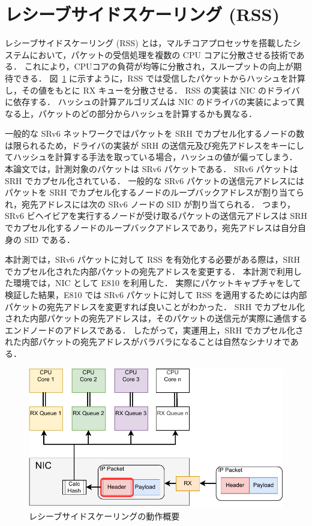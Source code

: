 \section{レシーブサイドスケーリング (RSS)}
\label{sec:rss}
レシーブサイドスケーリング (RSS) とは，マルチコアプロセッサを搭載したシステムにおいて，パケットの受信処理を複数の CPU コアに分散させる技術である．
これにより，CPUコアの負荷が均等に分散され，スループットの向上が期待できる．
図~\ref*{fig:rss} に示すように，RSS では受信したパケットからハッシュを計算し，その値をもとに RX キューを分散させる．
RSS の実装は NIC のドライバに依存する．
ハッシュの計算アルゴリズムは NIC のドライバの実装によって異なる上，パケットのどの部分からハッシュを計算するかも異なる．

一般的な SRv6 ネットワークではパケットを SRH でカプセル化するノードの数は限られるため，ドライバの実装が SRH の送信元及び宛先アドレスをキーにしてハッシュを計算する手法を取っている場合，ハッシュの値が偏ってしまう．
本論文では，計測対象のパケットは SRv6 パケットである．
SRv6 パケットは SRH でカプセル化されている．
一般的な SRv6 パケットの送信元アドレスにはパケットを SRH でカプセル化するノードのループバックアドレスが割り当てられ，宛先アドレスには次の SRv6 ノードの SID が割り当てられる．
つまり，SRv6 ビヘイビアを実行するノードが受け取るパケットの送信元アドレスは SRH でカプセル化するノードのループバックアドレスであり，宛先アドレスは自分自身の SID である．

本計測では，SRv6 パケットに対して RSS を有効化する必要がある際は，SRH でカプセル化された内部パケットの宛先アドレスを変更する．
本計測で利用した環境では，NIC として E810 を利用した．
実際にパケットキャプチャをして検証した結果，E810 では SRv6 パケットに対して RSS を適用するためには内部パケットの宛先アドレスを変更すれば良いことがわかった．
SRH でカプセル化された内部パケットの宛先アドレスは，そのパケットの送信元が実際に通信するエンドノードのアドレスである．
したがって，実運用上，SRH でカプセル化された内部パケットの宛先アドレスがバラバラになることは自然なシナリオである．


\begin{figure}[t]
    \centering
    \includegraphics[width=0.95\linewidth]{img/RSS.pdf}
    \caption{レシーブサイドスケーリングの動作概要}
    \label{fig:rss}
\end{figure}

